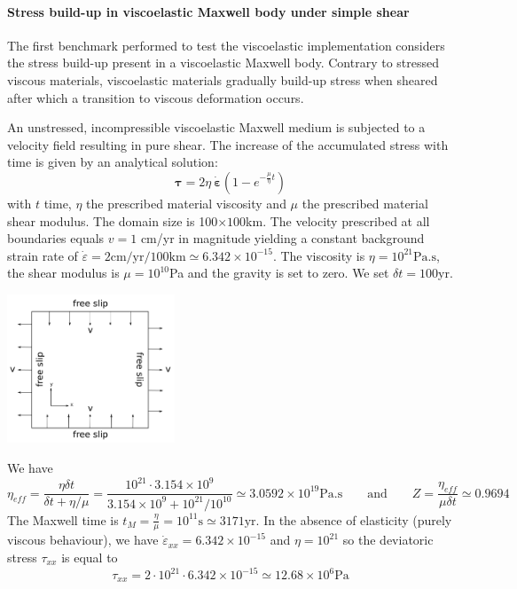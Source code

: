 \paragraph{Stress build-up in viscoelastic Maxwell body under simple shear}

The first benchmark performed to test the viscoelastic implementation considers the stress 
build-up present in a viscoelastic Maxwell body. Contrary to stressed viscous materials, 
viscoelastic materials gradually build-up stress when sheared after which a transition to viscous deformation occurs.  

An unstressed, incompressible viscoelastic Maxwell medium is subjected to a velocity field 
resulting in pure shear. 
The increase of the accumulated stress with time is given by an analytical solution:
\begin{equation}
{\bm \tau} = 2\eta\ {\dot{\bm \varepsilon}} \left ( 1-e^{-\frac{\mu }{\eta} t } \right )
\end{equation}
with $t$ time, $\eta$ the prescribed material viscosity and $\mu$ the prescribed material shear modulus. 
The domain size is 100$\times 100$km.
The velocity prescribed at all boundaries equals $v=1$ cm/yr in magnitude yielding a constant 
background strain rate of $\dot{\varepsilon}=2\text{cm/yr}/100\text{km}\simeq 6.342\times 10^{-15}$. 
The viscosity is $\eta= 10^{21}\text{Pa.s}$, the shear modulus is 
$\mu =10^{10}$Pa and the gravity is set to zero. We set $\delta t=100$yr.  

\begin{center}
\includegraphics[width=5cm]{python_codes/fieldstone_64/images/stress_buildup_setup.png}\\
\end{center}

We have 
\[
\eta_{eff} 
= \frac{\eta \delta t}{\delta t + \eta/\mu} 
= \frac{10^{21} \cdot 3.154\times 10^{9}}{3.154\times 10^{9} + 10^{21}/10^{10}} 
\simeq 
3.0592 \times 10^{19}\text{Pa.s}
\qquad
\text{and}
\qquad
Z=\frac{\eta_{eff}}{\mu \delta t} 
\simeq 
0.9694
\]
The Maxwell time is $t_M = \frac{\eta}{\mu} = 10^{11}\text{s} \simeq 3171\text{yr}$.
In the absence of elasticity (purely viscous behaviour), we have 
$\dot{\varepsilon}_{xx} = 6.342\times 10^{-15}$ 
and $\eta=10^{21}$ so the 
deviatoric stress $\tau_{xx}$ is equal to 
\[
\tau_{xx} = 2 \cdot 10^{21} \cdot 6.342\times 10^{-15} \simeq 12.68 \times 10^6 \text{Pa}
\]

